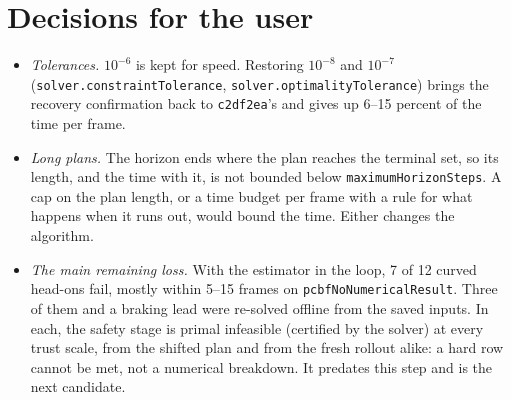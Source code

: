 \documentclass[11pt]{article}
\begin{document}
\section{Decisions for the user}
\begin{itemize}
\item \emph{Tolerances.} $10^{-6}$ is kept for speed. Restoring $10^{-8}$
  and $10^{-7}$ (\texttt{solver.constraintTolerance},
  \texttt{solver.optimalityTolerance}) brings the recovery confirmation
  back to \texttt{c2df2ea}'s and gives up 6--15 percent of the time per
  frame.
\item \emph{Long plans.} The horizon ends where the plan reaches the
  terminal set, so its length, and the time with it, is not bounded below
  \texttt{maximumHorizonSteps}. A cap on the plan length, or a time budget
  per frame with a rule for what happens when it runs out, would bound the
  time. Either changes the algorithm.
\item \emph{The main remaining loss.} With the estimator in the loop, 7 of
  12 curved head-ons fail, mostly within 5--15 frames on
  \texttt{pcbfNoNumericalResult}. Three of them and a braking lead were
  re-solved offline from the saved inputs. In each, the safety stage is
  primal infeasible (certified by the solver) at every trust scale, from the
  shifted plan and from the fresh rollout alike: a hard row cannot be met,
  not a numerical breakdown. It predates this step and is the next
  candidate.
\end{itemize}
\end{document}
